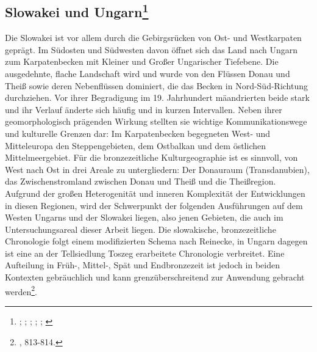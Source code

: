 \documentclass[openany,twoside,twocolumn]{book}
\let\rmarkdownfootnote\footnote%
\def\footnote{\protect\rmarkdownfootnote}
\begin{document}
\hypertarget{slowakei-und-ungarn}{%
\subsection[Slowakei und Ungarn]{\texorpdfstring{Slowakei und
Ungarn\footnote{\textcite{furmanek_bronzezeit_1999};
  \textcite{kemenczei_spatbronzezeit_1984};
  \textcite{lochner_bestattungssitten_2013};
  \textcite{markova_slovakia_2013}; \textcite{sorensen_landscapes_2008};
  \textcite{vicze_bestattungen_1992}}}{Slowakei und Ungarn}}\label{slowakei-und-ungarn}}

Die Slowakei ist vor allem durch die Gebirgsrücken von Ost- und
Westkarpaten geprägt. Im Südosten und Südwesten davon öffnet sich das
Land nach Ungarn zum Karpatenbecken mit Kleiner und Großer Ungarischer
Tiefebene. Die ausgedehnte, flache Landschaft wird und wurde von den
Flüssen Donau und Theiß sowie deren Nebenflüssen dominiert, die das
Becken in Nord-Süd-Richtung durchziehen. Vor ihrer Begradigung im 19.
Jahrhundert mäandrierten beide stark und ihr Verlauf änderte sich häufig
und in kurzen Intervallen. Neben ihrer geomorphologisch prägenden
Wirkung stellten sie wichtige Kommunikationswege und kulturelle Grenzen
dar: Im Karpatenbecken begegneten West- und Mitteleuropa den
Steppengebieten, dem Ostbalkan und dem östlichen Mittelmeergebiet. Für
die bronzezeitliche Kulturgeographie ist es sinnvoll, von West nach Ost
in drei Areale zu untergliedern: Der Donauraum (Transdanubien), das
Zwischenstromland zwischen Donau und Theiß und die Theißregion. Aufgrund
der großen Heterogenität und inneren Komplexität der Entwicklungen in
diesen Regionen, wird der Schwerpunkt der folgenden Ausführungen auf dem
Westen Ungarns und der Slowakei liegen, also jenen Gebieten, die auch im
Untersuchungsareal dieser Arbeit liegen. Die slowakische,
bronzezeitliche Chronologie folgt einem modifizierten Schema nach
Reinecke, in Ungarn dagegen ist eine an der Tellsiedlung Toszeg
erarbeitete Chronologie verbreitet. Eine Aufteilung in Früh-, Mittel-,
Spät und Endbronzezeit ist jedoch in beiden Kontexten gebräuchlich und
kann grenzüberschreitend zur Anwendung gebracht werden\footnote{\textcite{markova_slovakia_2013},
  813-814.}.
\end{document}
